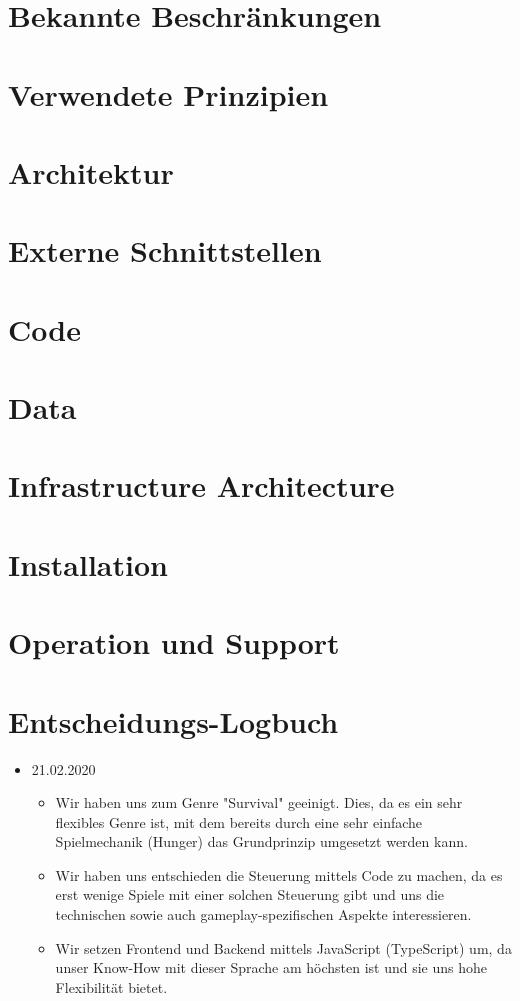 \documentclass[a4paper, 11pt]{scrartcl}
\let\oldsection\section
\renewcommand\section{\clearpage\oldsection}
\begin{document}
\section{Bekannte Beschränkungen}

\section{Verwendete Prinzipien}

\section{Architektur}

\section{Externe Schnittstellen}

\section{Code}

\section{Data}

\section{Infrastructure Architecture}

\section{Installation}

\section{Operation und Support}

\section{Entscheidungs-Logbuch}

\begin{itemize}
  \item 21.02.2020
  \begin{itemize}
    \item Wir haben uns zum Genre "Survival" geeinigt. Dies, da es ein sehr flexibles Genre ist, mit dem bereits durch eine sehr einfache Spielmechanik (Hunger) das Grundprinzip umgesetzt werden kann.
    \item Wir haben uns entschieden die Steuerung mittels Code zu machen, da es erst wenige Spiele mit einer solchen Steuerung gibt und uns die technischen sowie auch gameplay-spezifischen Aspekte interessieren.
    \item Wir setzen Frontend und Backend mittels JavaScript (TypeScript) um, da unser Know-How mit dieser Sprache am höchsten ist und sie uns hohe Flexibilität bietet.
  \end{itemize}
\end{itemize}

\clearpage

\printglossary[type=\acronymtype]

\printglossary
\end{document}
